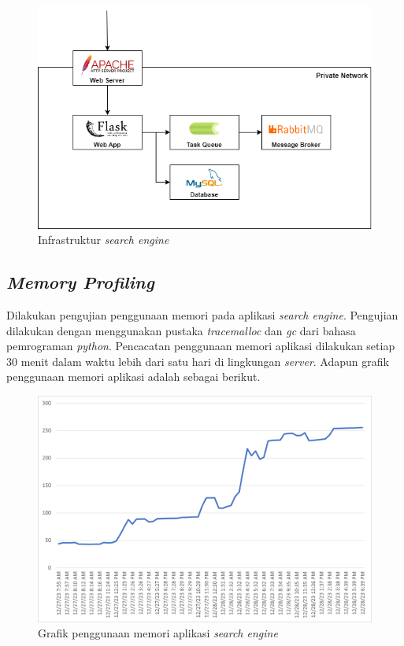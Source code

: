 \documentclass[
	a4paper, %
	10pt, %
	unnumberedsections, %
	twoside, %
]{LTJournalArticle}
\begin{document}
\begin{figure}[H]
	\centering
	\includegraphics[width=\linewidth]{infra.png}
	\caption{Infrastruktur \textit{search engine}}
\end{figure}

\subsection{\textit{Memory Profiling}}
Dilakukan pengujian penggunaan memori pada aplikasi \textit{search engine}. Pengujian dilakukan dengan menggunakan pustaka \textit{tracemalloc} dan \textit{gc} dari bahasa pemrograman \textit{python}. Pencacatan penggunaan memori aplikasi dilakukan setiap 30 menit dalam waktu lebih dari satu hari di lingkungan \textit{server}. Adapun grafik penggunaan memori aplikasi adalah sebagai berikut.


\begin{figure}[H]
	\includegraphics[width=\linewidth]{memchart.png}
	\caption{Grafik penggunaan memori aplikasi \textit{search engine}}
\end{figure}
\end{document}
